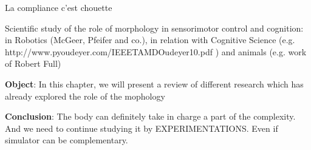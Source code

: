 La compliance c'est chouette


Scientific study of the role of morphology in sensorimotor control and cognition: in Robotics (McGeer, Pfeifer and co.), in relation with Cognitive Science (e.g.
http://www.pyoudeyer.com/IEEETAMDOudeyer10.pdf ) and animals (e.g.
work of Robert Full)

\textbf{Object}: In this chapter, we will present a review of different research which has already explored the role of the mophology


\textbf{Conclusion}: The body can definitely take in charge a part of the complexity.
And we need to continue studying it by EXPERIMENTATIONS.
Even if simulator can be complementary.

